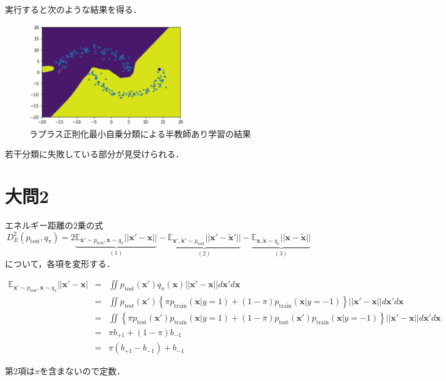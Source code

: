 \documentclass[dvipdfmx]{jsarticle}
\newcommand{\bmx}{\bm{x}}
\newcommand{\bmxd}{\bm{x}{'}}
\newcommand{\ptrain}{p_{\text{train}}}
\newcommand{\hoge}{\mathbb{E}_{\bmxd \sim p_{\text{test}}, \bmx \sim q_\pi}}
\newcommand{\fuga}{\mathbb{E}_{\bmxd, \tilde{\bmx}' \sim p_{\text{test}}}}
\newcommand{\piyo}{\mathbb{E}_{\bmx, \tilde{\bmx} \sim q_\pi}}
\begin{document}
実行すると次のような結果を得る．
\begin{figure}[h]
  \begin{center}
    \includegraphics[width=0.6\textwidth]{figs/laplacian_normalization_result.eps}
  \end{center}
  \caption{ラプラス正則化最小自乗分類による半教師あり学習の結果}
\end{figure}
若干分類に失敗している部分が見受けられる．

\newpage

\section*{大問2}

エネルギー距離の2乗の式
$$
D_E^2 (p_{\text{test}}, q_\pi) = 2 \underbrace{\hoge||\bmxd - \bmx||}_{(1)}
- \underbrace{\fuga||\bmxd - \tilde{\bmx}'||}_{(2)}
- \underbrace{\piyo||\bmx - \tilde{\bmx}||}_{(3)}
$$
について，各項を変形する．%

\begin{eqnarray*}
 \hoge||\bmxd - \bmx|
 &=& \iint p_\text{test}(\bmx') q_\pi(\bmx) ||\bmx' - \bmx|| d\bmx' d\bmx \\
 &=& \iint p_\text{test}(\bmx') \left\{ \pi \ptrain(\bmx|y=1) + (1-\pi)\ptrain(\bmx|y=-1) \right\} ||\bmx' - \bmx|| d\bmx' d\bmx \\
 &=& \iint \left\{\pi p_\text{test}(\bmx')\ptrain(\bmx|y=1) + (1-\pi)p_\text{test}(\bmx')\ptrain(\bmx|y=-1) \right\} ||\bmx' - \bmx|| d\bmx' d\bmx \\
 &=& \pi b_{+1} + (1-\pi) b_{-1} \\
 &=& \pi (b_{+1} - b_{-1}) +  b_{-1}
\end{eqnarray*}

第2項は$\pi$を含まないので定数．
\end{document}
